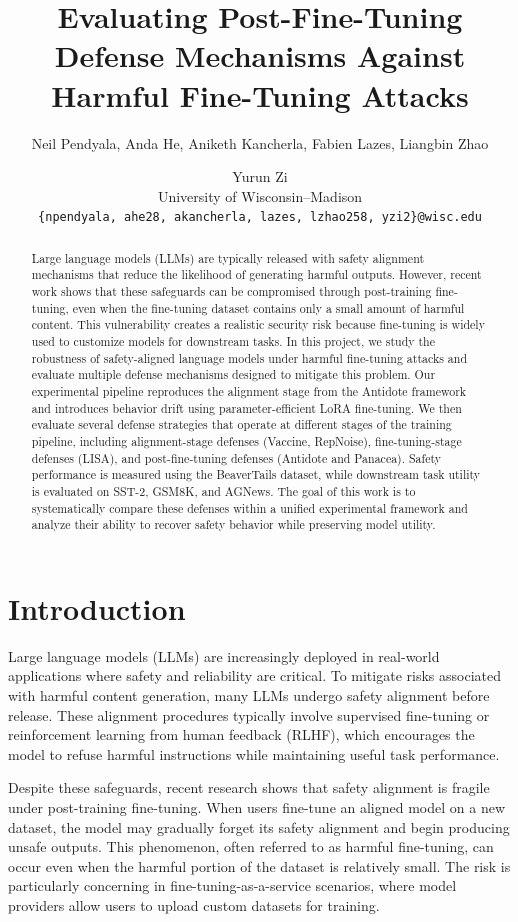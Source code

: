 \documentclass[11pt]{article}
\title{Evaluating Post-Fine-Tuning Defense Mechanisms Against Harmful Fine-Tuning Attacks}
\author{
Neil Pendyala, Anda He, Aniketh Kancherla, Fabien Lazes, Liangbin Zhao \and Yurun Zi \\
University of Wisconsin--Madison \\
\texttt{\{npendyala, ahe28, akancherla, lazes, lzhao258, yzi2\}@wisc.edu}
}
\begin{document}
\maketitle
\begin{abstract}
Large language models (LLMs) are typically released with safety alignment mechanisms that reduce the likelihood of generating harmful outputs. However, recent work shows that these safeguards can be compromised through post-training fine-tuning, even when the fine-tuning dataset contains only a small amount of harmful content. This vulnerability creates a realistic security risk because fine-tuning is widely used to customize models for downstream tasks. In this project, we study the robustness of safety-aligned language models under harmful fine-tuning attacks and evaluate multiple defense mechanisms designed to mitigate this problem. Our experimental pipeline reproduces the alignment stage from the Antidote framework and introduces behavior drift using parameter-efficient LoRA fine-tuning. We then evaluate several defense strategies that operate at different stages of the training pipeline, including alignment-stage defenses (Vaccine, RepNoise), fine-tuning-stage defenses (LISA), and post-fine-tuning defenses (Antidote and Panacea). Safety performance is measured using the BeaverTails dataset, while downstream task utility is evaluated on SST-2, GSM8K, and AGNews. The goal of this work is to systematically compare these defenses within a unified experimental framework and analyze their ability to recover safety behavior while preserving model utility.
\end{abstract}

\section{Introduction}

Large language models (LLMs) are increasingly deployed in real-world applications where safety and reliability are critical. To mitigate risks associated with harmful content generation, many LLMs undergo safety alignment before release. These alignment procedures typically involve supervised fine-tuning or reinforcement learning from human feedback (RLHF), which encourages the model to refuse harmful instructions while maintaining useful task performance.

Despite these safeguards, recent research shows that safety alignment is fragile under post-training fine-tuning. When users fine-tune an aligned model on a new dataset, the model may gradually forget its safety alignment and begin producing unsafe outputs. This phenomenon, often referred to as harmful fine-tuning, can occur even when the harmful portion of the dataset is relatively small. The risk is particularly concerning in fine-tuning-as-a-service scenarios, where model providers allow users to upload custom datasets for training.
\end{document}
